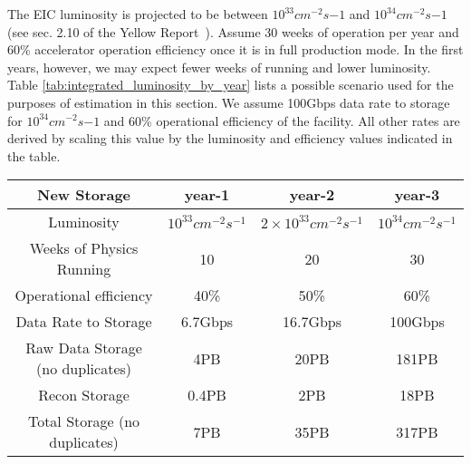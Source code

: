 


The EIC luminosity is projected to be between $10^{33}cm^{-2}s{-1}$ and $10^{34}cm^{-2}s{-1}$ (see sec. 2.10 of the Yellow Report~\cite{YellowReport}). Assume 30 weeks of operation per year and 60\% accelerator operation efficiency once it is in full production mode. In the first years, however, we may expect fewer weeks of running and lower luminosity. Table \ref{tab:integrated_luminosity_by_year} lists a possible scenario used for the purposes of estimation in this section. We assume 100Gbps data rate to storage for $10^{34}cm^{-2}s{-1}$ and 60\% operational efficiency of the facility. All other rates are derived by scaling this value by the luminosity and efficiency values indicated in the table.


\begin{table*}[htb]
    \centering
    \begin{tabular}{c|c|c|c}
        \hline
        \hline
         \textbf{New Storage}       & year-1                & year-2                  & year-3                \\
        \hline
         Luminosity              & $10^{33}cm^{-2}s^{-1}$ & $2\times10^{33}cm^{-2}s^{-1}$ & $10^{34}cm^{-2}s^{-1}$ \\
         \hline
         Weeks of Physics Running        & 10                    & 20                      & 30                    \\
         \hline
         Operational efficiency    & 40\%                  & 50\%                    & 60\%                  \\
         \hline
         Data Rate to Storage    & 6.7Gbps               & 16.7Gbps                & 100Gbps               \\
         \hline
         Raw Data Storage (no duplicates) & 4PB          & 20PB                    & 181PB                 \\
         \hline
         Recon Storage          & 0.4PB                  & 2PB                    & 18PB                   \\ %
         \hline
         Total Storage (no duplicates) & 7PB           & 35PB                   & 317PB                  \\
         \hline
   \end{tabular}
    \caption{Estimate of raw data tape storage needed for first 3 years of EIC running (ECCE only). Values are estimates assuming ramp up to full luminosity  by year 3. Numbers for the first two years are estimated for the purposes of this exercise and do not come from an external source. n.b. each value represents \emph{only} the needs for data produced in that year and \emph{not} a cumulative total.}
    \label{tab:integrated_luminosity_by_year}
\end{table*}

